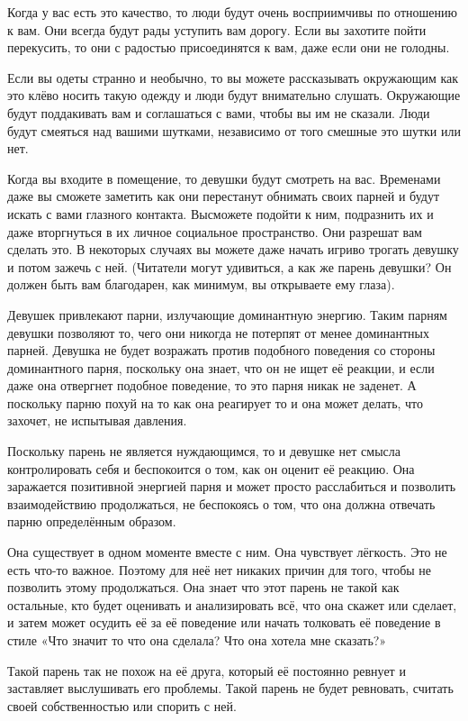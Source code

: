 Когда у вас есть это качество, то люди будут очень восприимчивы по отношению к вам. Они всегда будут рады уступить вам дорогу. Если вы захотите пойти перекусить, то они с радостью присоединятся к вам, даже если они не голодны.

Если вы одеты странно и необычно, то вы можете рассказывать окружающим как это клёво носить такую одежду и люди будут внимательно слушать. Окружающие будут поддакивать вам и соглашаться с вами, чтобы вы им не сказали. Люди будут смеяться над вашими шутками, независимо от того смешные это шутки или нет.

Когда вы входите в помещение, то девушки будут смотреть на вас. Временами даже вы сможете заметить как они перестанут обнимать своих парней и будут искать с вами глазного контакта. Высможете подойти к ним, подразнить их и даже вторгнуться в их личное социальное пространство. Они разрешат вам сделать это. В некоторых случаях вы можете даже начать игриво трогать девушку и потом зажечь с ней. (Читатели могут удивиться, а как же парень девушки? Он должен быть вам благодарен, как минимум, вы открываете ему глаза).

Девушек привлекают парни, излучающие доминантную энергию. Таким парням девушки позволяют то, чего они никогда не потерпят от менее доминантных парней. Девушка не будет возражать против подобного поведения со стороны доминантного парня, поскольку она знает, что он не ищет её реакции, и если даже она отвергнет подобное поведение, то это парня никак не заденет. А поскольку парню похуй на то как она реагирует то и она может делать, что захочет, не испытывая давления.

Поскольку парень не является нуждающимся, то и девушке нет смысла контролировать себя и беспокоится о том, как он оценит её реакцию. Она заражается позитивной энергией парня и может просто расслабиться и позволить взаимодействию продолжаться, не беспокоясь о том, что она должна отвечать парню определённым образом.

Она существует в одном моменте вместе с ним. Она чувствует лёгкость. Это не есть что-то важное. Поэтому для неё нет никаких причин для того, чтобы не позволить этому продолжаться. Она знает что этот парень не такой как остальные, кто будет оценивать и анализировать всё, что она скажет или сделает, и затем может осудить её за её поведение или начать толковать её поведение в стиле «Что значит то что она сделала? Что она хотела мне сказать?»

Такой парень так не похож на её друга, который её постоянно ревнует и заставляет выслушивать его проблемы. Такой парень не будет ревновать, считать своей собственностью или спорить с ней.

